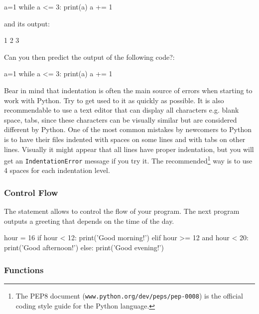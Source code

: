 \begin{python}
a=1
while a <= 3:
    print(a)
    a += 1
\end{python}

\noindent and its output:

\begin{python}
1
2
3
\end{python}


\begin{exercise}
Can you then predict the output of the following code?:

\begin{python}
a=1
while a <= 3:
    print(a)
a += 1
\end{python}

\end{exercise}

\noindent Bear in mind that indentation is often the main source of errors when starting to work with Python. Try to get used to it as quickly as possible. It is also recommendable to use a text editor that can display all characters e.g. blank space, tabs, since these characters can be visually similar but are considered different by Python. One of the most common mistakes by newcomers to Python is to have their files indented with spaces on some lines and with tabs on other lines. Visually it might appear that all lines have proper indentation, but you will get an \texttt{IndentationError} message if you try it. The recommended\footnote{The PEP8 document (\texttt{www.python.org/dev/peps/pep-0008}) is the official coding style guide for the Python language.} way is to use 4 spaces for each indentation level.

\subsubsection{Control Flow}

The  statement allows to control the flow of your program. The next program outputs a greeting that depends on the time of the day.

\begin{python}
hour = 16
if hour < 12:
    print('Good morning!')
elif hour >= 12 and hour < 20:
    print('Good afternoon!')
else:
    print('Good evening!')
\end{python}

\subsubsection{Functions}

